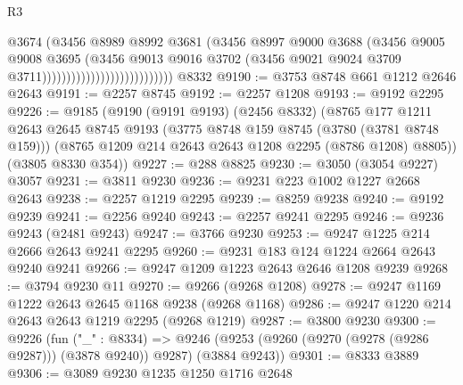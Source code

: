 \begin{lexlean}{R3}
\begin{coremodule}
                                                @3674
                                                (@3456
                                                  @8989
                                                  @8992
                                                  @3681
                                                  (@3456
                                                    @8997
                                                    @9000
                                                    @3688
                                                    (@3456
                                                      @9005
                                                      @9008
                                                      @3695
                                                      (@3456
                                                        @9013
                                                        @9016
                                                        @3702
                                                        (@3456
                                                          @9021
                                                          @9024
                                                          @3709
                                                          @3711)))))))))))))))))))))))))))
    @8332
@9190 := @3753 @8748 @661 @1212 @2646 @2643
@9191 := @2257 @8745
@9192 := @2257 @1208
@9193 := @9192 @2295
@9226 := @9185
    (@9190
      (@9191 @9193)
      (@2456 @8332)
      (@8765
        @177
        @1211
        @2643
        @2645
        @8745
        @9193
        (@3775 @8748 @159 @8745 (@3780 (@3781 @8748 @159)))
        (@8765 @1209 @214 @2643 @2643 @1208 @2295 (@8786 @1208) @8805))
      (@3805 @8330 @354))
@9227 := @288 @8825
@9230 := @3050 (@3054 @9227) @3057
@9231 := @3811 @9230
@9236 := @9231 @223 @1002 @1227 @2668 @2643
@9238 := @2257 @1219 @2295
@9239 := @8259 @9238
@9240 := @9192 @9239
@9241 := @2256 @9240
@9243 := @2257 @9241 @2295
@9246 := @9236 @9243 (@2481 @9243)
@9247 := @3766 @9230
@9253 := @9247 @1225 @214 @2666 @2643 @9241 @2295
@9260 := @9231 @183 @124 @1224 @2664 @2643 @9240 @9241
@9266 := @9247 @1209 @1223 @2643 @2646 @1208 @9239
@9268 := @3794 @9230 @11
@9270 := @9266 (@9268 @1208)
@9278 := @9247 @1169 @1222 @2643 @2645 @1168 @9238 (@9268 @1168)
@9286 := @9247 @1220 @214 @2643 @2643 @1219 @2295 (@9268 @1219)
@9287 := @3800 @9230
@9300 := @9226
    (fun ("_" : @8334) =>
    @9246 (@9253 (@9260 (@9270 (@9278 (@9286 @9287))) (@3878 @9240)) @9287) (@3884 @9243))
@9301 := @8333 @3889
@9306 := @3089 @9230 @1235 @1250 @1716 @2648

\end{coremodule}
\end{lexlean}
